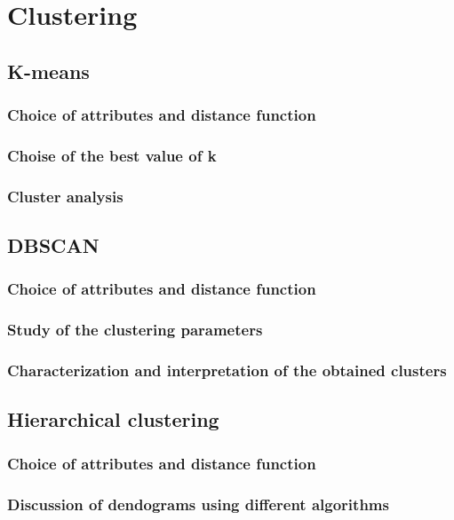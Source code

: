 \documentclass[11pt,a4paper]{report}
\begin{document}
\chapter{Clustering}

\section{K-means}


\subsection{Choice of attributes and distance function}
\subsection{Choise of the best value of k}
\subsection{Cluster analysis}

\section{DBSCAN}
\subsection{Choice of attributes and distance function}
\subsection{Study of the clustering parameters}
\subsection{Characterization and interpretation of the obtained clusters}

\section{Hierarchical clustering}
\subsection{Choice of attributes and distance function}
\subsection{Discussion of dendograms using different algorithms}
\end{document}
